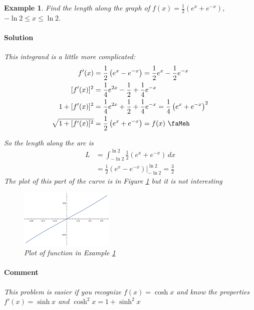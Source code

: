\documentclass[letterpaper, 11pt, openany]{book}
\theoremstyle{mytheoremstyle}
\theoremstyle{myexamplestyle}
\newtheorem{example}{Example}[section]
\newenvironment{solution}{\paragraph{\sffamily \smaller \fontseries{b}\selectfont Solution}}{\hfill\faSquare}
\newenvironment{commentary}{\paragraph{\sffamily \smaller \fontseries{b}\selectfont Comment}}{}
\begin{document}
\begin{example}\label{e:arc-length-exp}
    Find the length along the graph of $f(x) = \frac{1}{2} \left( e^{x} + e^{-x} \right)$, $-\ln 2 \leq x \leq \ln 2$.
    
    \begin{solution}
        This integrand is a little more complicated:
        \begin{align*}
            f'(x) &= \frac{1}{2}\left( e^{x} - e^{-x} \right)  = \frac{1}{2} e^{x} - \frac{1}{2} e^{-x}        \\
            [f'(x)]^{2} &= \frac{1}{4}e^{2x} - \frac{1}{2} + \frac{1}{4}e^{-x}\\
            1 + [f'(x)]^{2} &= \frac{1}{4}e^{2x} + \frac{1}{2} + \frac{1}{4}e^{-x} = \frac{1}{4} \left( e^{x} + e^{-x} \right)^{2}\\
            \sqrt{1 + [f'(x)]^{2}} &= \frac{1}{2} \left( e^{x} + e^{-x} \right) = f(x) \text{ \faMeh}
        \end{align*}
    
        So the length along the arc is
        \begin{align*}
            L   &= \int_{-\ln 2}^{\ln 2}  \frac{1}{2} \left( e^{x} + e^{-x} \right) \, dx \\
                &= \frac{1}{2}\left( e^{x} - e^{-x} \right)\bigg|_{-\ln 2}^{\ln 2} = \frac{3}{2}
        \end{align*}
        The plot of this part of the curve is in Figure \ref{f:arc-length-exp} but it is not interesting \faMeh
    \end{solution}
    \begin{figure}[htbp]
        \centering
            \includegraphics[width=0.4\textwidth]{Figures/arclengthexp.pdf}
        \caption{Plot of function in Example \ref{e:arc-length-exp}}
        \label{f:arc-length-exp}
    \end{figure}    
    \begin{commentary}
        This problem is easier if you recognize $f(x) = \cosh x$ and know the properties $f'(x) = \sinh x$ and $\cosh^{2} x = 1 + \sinh^{2} x$ \faSmile
    \end{commentary}
\end{example}
\end{document}
